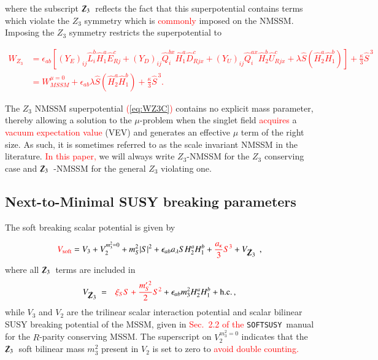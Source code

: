 \documentclass[final,3p,times,pdflatex]{elsarticle}
\def\SOFTSUSY{{\tt SOFTSUSY}\ }
\newcommand{\be}{\begin{equation}}
\newcommand{\ee}{\end{equation}}
\newcommand{\ba}{\begin{eqnarray}}
\newcommand{\ea}{\end{eqnarray}}
\newcommand{\Zv}{{\mbox{$\slashed{Z}_{3}$}\ }} %
\newcommand*{\red}[1]{\textcolor{red}{#1}}
\begin{document}
\noindent where the subscript \Zv reflects the fact that this superpotential contains terms which violate the $Z_3$ symmetry which is \red{commonly} %
 imposed on the NMSSM.  Imposing the $Z_3$ symmetry restricts the superpotential to

\red{
\begin{align} 
 W_{Z_3} &= \epsilon_{ab} \left[ (Y_E)_{ij} \widehat{L}_i^b
\widehat{H}_1^a \widehat{E}^c_{Rj} + (Y_D)_{ij} \widehat{Q}_i^{bx} \widehat{H}_1^a \widehat{D}^c_{Rjx} +
(Y_U)_{ij} \widehat{Q}_i^{ax} \widehat{H}_2^b \widehat{U}^c_{Rjx}  
+\lambda \widehat{S}(\widehat{H}^a_2 \widehat{H}^b_1) \right ]+\frac{\kappa}{3}\widehat{S}^{\, 3} \\
 &= W_{MSSM}^{\mu =0}  + \epsilon_{ab} \lambda \widehat{S} (\widehat{H}^a_2 \widehat{H}^b_1) +\frac{\kappa}{3}\widehat{S}^{\, 3}.
\label{eq:WZ3C}
\end{align}
} %

\noindent The $Z_3$ NMSSM superpotential \red{(\ref{eq:WZ3C})} %
 contains no explicit mass parameter, thereby allowing a solution to the $\mu$-problem when the singlet field \red{acquires} a \red{vacuum expectation value} (VEV) and generates an effective $\mu$ term of the right size.   As such, it is sometimes referred to as the scale invariant NMSSM in the literature.  \red{In this paper,} %
 we will always write $Z_3$-NMSSM for the $Z_3$ conserving case and \Zv-NMSSM for the general $Z_3$ violating one. 


\subsection{Next-to-Minimal SUSY breaking parameters \label{sec:susybreak}}
The soft breaking scalar potential is given by

\be \red{V_{\textrm{soft}}} %
 = V_3 + V^{m_3^2 = 0}_2 + m_S^2|S|^2 + \epsilon_{ab} a_\lambda S H^a_2 H^b_1 + \red{\frac{a_\kappa}{3} S^3} %
 + V_\Zv \,,
\ee 
where all \Zv terms are included in
\ba V_\Zv & = &  \red{\xi_S S + \frac{m_S^{\prime \, 2}}{2} S^2} %
  + \epsilon_{ab} m_3^2 H_2^a H_1^b + \textrm{h.c.} \,,
\ea 
while $V_3$ and $V_2$ are the trilinear scalar interaction potential and scalar bilinear SUSY breaking potential of the MSSM, given in \red{Sec.\ 2.2 of the} %
\SOFTSUSY manual \cite{Allanach:2001kg} for the $R$-parity conserving MSSM.   The superscript on $V^{m_3^2 = 0}_2$ indicates that the \Zv soft bilinear mass $m_3^2$ present in $V_2$ is set to zero to \red{avoid double counting.} %
\end{document}
